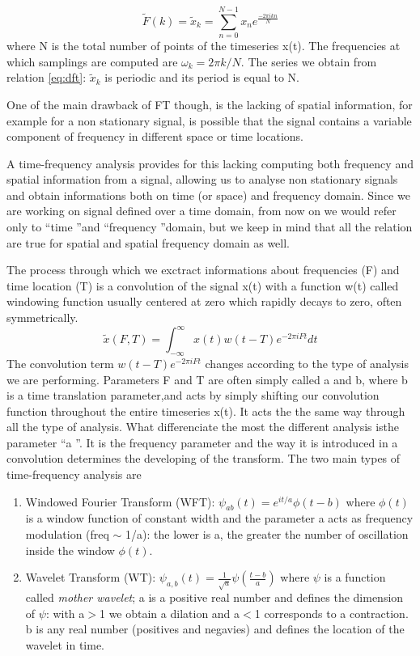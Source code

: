 \documentclass[11pt]{report}
\begin{document}
\begin{equation}\label{eq:dft}
 \tilde{F}(k) = \tilde{x}_k = \sum_{n = 0}^{N-1}x_n e^{\frac{-2\pi i k n}{N}}
\end{equation}
where N is the total number of points of the timeseries x(t).
The frequencies at which samplings are computed are $\omega_k = 2\pi k/N$.
The series we obtain from relation \ref{eq:dft}: $\tilde{x}_k$ is periodic and its period is equal to N.

One of the main drawback of FT though, is the lacking of spatial information, for example for a non stationary signal, is possible that the signal contains a variable component of frequency in different space or time locations.

A time-frequency analysis provides for this lacking computing both frequency and spatial information from a signal, allowing us to analyse non stationary signals and obtain informations both on time (or space) and frequency domain.
Since we are working on signal defined over a time domain, from now on we would refer only to  \textquotedblleft time \textquotedblright  and  \textquotedblleft frequency \textquotedblright domain, but we keep in mind that all the relation are true for spatial and spatial frequency domain as well.

The process through which we exctract informations about frequencies (F) and time location (T) is a convolution of the signal x(t) with a function w(t) called windowing function usually centered at zero which rapidly decays to zero, often symmetrically.
\begin{equation}
\tilde{x}(F, T) = \int_{-\infty}^{\infty} x(t)w(t-T) e^{-2\pi i F t} dt
\end{equation}
The convolution term $w(t-T) e^{-2\pi i F t}$ changes according to the type of analysis we are performing. Parameters F and T are often simply called a and b, where b is a time translation parameter,and acts by simply shifting our convolution function throughout the entire timeseries x(t). It acts the the same way through all the type of analysis.
What differenciate the most the different analysis isthe parameter \textquotedblleft a \textquotedblright.
It is the frequency parameter and the way it is introduced in a convolution determines the developing of the transform.
The two main types of time-frequency analysis are

\begin{enumerate}
\item Windowed Fourier Transform (WFT): $\psi_{ab}(t) = e^{it/a}\phi(t-b)$ where $\phi(t)$ is a window function of constant width and the parameter a acts as frequency modulation (freq $\sim$ 1/a): the lower is a, the greater the number of oscillation inside the window $\phi(t)$.
\item Wavelet Transform (WT): $\psi_{a, b}(t) = \frac{1}{\sqrt{a}}\psi(\frac{t-b}{a})$ where $\psi$ is a function called \emph{mother wavelet}; a is a positive real number and defines the dimension of $\psi$: with a$>$1 we obtain a dilation and a$<$1 corresponds to a contraction. b is any real number (positives and negavies) and defines the location of the wavelet in time.
\end{enumerate}
\end{document}
